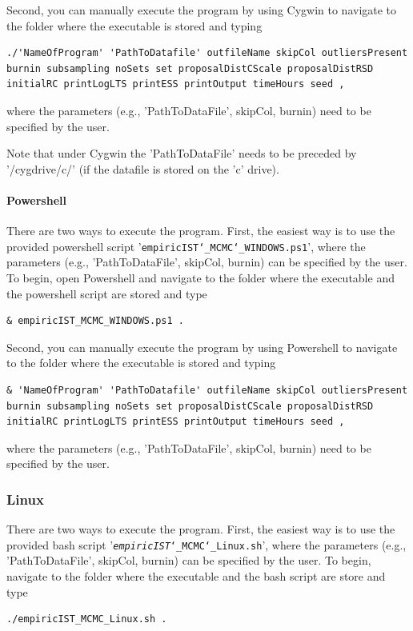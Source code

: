 \documentclass[12pt,a4paper]{scrartcl}
\begin{document}
Second, you can manually execute the program by using Cygwin to navigate to the folder where the executable is stored and typing
 \begin{lstlisting}[breaklines=true] 
./'NameOfProgram' 'PathToDatafile' outfileName skipCol outliersPresent burnin subsampling noSets set proposalDistCScale proposalDistRSD initialRC printLogLTS printESS printOutput timeHours seed ,
\end{lstlisting}  
where the parameters (e.g., 'PathToDataFile', skipCol, burnin) need to be specified by the user. 

Note that under Cygwin the 'PathToDataFile' needs to be preceded by '/cygdrive/c/' (if the datafile is stored on the 'c' drive).

\paragraph{Powershell}

There are two ways to execute the program. First, the easiest way is to use the provided powershell script '\texttt{empiricIST\char`_MCMC\char`_WINDOWS.ps1}', where the parameters (e.g., 'PathToDataFile', skipCol, burnin) can be specified by the user.
To begin, open Powershell and navigate to the folder where the executable and the powershell script are stored and type
\begin{lstlisting}
& empiricIST_MCMC_WINDOWS.ps1 .
\end{lstlisting}

Second, you can manually execute the program by using Powershell to navigate to the folder where the executable is stored and typing
 \begin{lstlisting}[breaklines=true] 
& 'NameOfProgram' 'PathToDatafile' outfileName skipCol outliersPresent burnin subsampling noSets set proposalDistCScale proposalDistRSD initialRC printLogLTS printESS printOutput timeHours seed ,
\end{lstlisting}  
where the parameters (e.g., 'PathToDataFile', skipCol, burnin) need to be specified by the user. 

\subsubsection*{Linux}

There are two ways to execute the program. First, the easiest way is to use the provided bash script '\texttt{\emph{empiricIST}\char`_MCMC\char`_Linux.sh}', where the parameters (e.g., 'PathToDataFile', skipCol, burnin) can be specified by the user.
To begin, navigate to the folder where the executable and the bash script are store and type
\begin{lstlisting}
./empiricIST_MCMC_Linux.sh .
\end{lstlisting}
\end{document}

